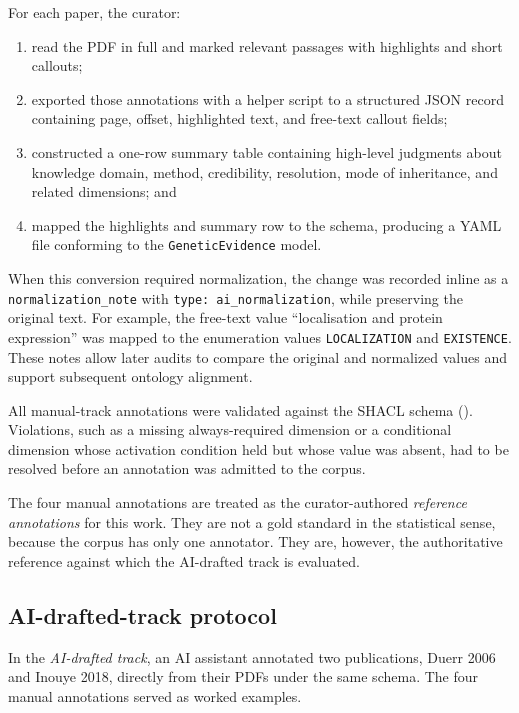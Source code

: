 For each paper, the curator:

\begin{enumerate}
  \item read the PDF in full and marked relevant passages with highlights
        and short callouts;
  \item exported those annotations with a helper script to a structured JSON
        record containing page, offset, highlighted text, and free-text
        callout fields;
  \item constructed a one-row summary table containing high-level judgments
        about knowledge domain, method, credibility, resolution, mode of
        inheritance, and related dimensions; and
  \item mapped the highlights and summary row to the schema, producing a
        YAML file conforming to the \texttt{GeneticEvidence} model.
\end{enumerate}

When this conversion required normalization, the change was recorded inline
as a \texttt{normalization\_note} with
\texttt{type: ai\_normalization}, while preserving the original text. For
example, the free-text value ``localisation and protein expression'' was
mapped to the enumeration values \texttt{LOCALIZATION} and
\texttt{EXISTENCE}. These notes allow later audits to compare the original
and normalized values and support subsequent ontology alignment.

All manual-track annotations were validated against the SHACL schema
(). Violations, such as a missing
always-required dimension or a conditional dimension whose activation
condition held but whose value was absent, had to be resolved before an
annotation was admitted to the corpus.

The four manual annotations are treated as the curator-authored
\emph{reference annotations} for this work. They are not a gold standard in the statistical sense, because the
corpus has only one annotator. They are, however, the authoritative reference
against which the AI-drafted track is evaluated.

\subsection{AI-drafted-track protocol}

In the \emph{AI-drafted track}, an AI assistant annotated two publications,
Duerr 2006 and Inouye 2018, directly from their PDFs under the same schema.
The four manual annotations served as worked examples.

